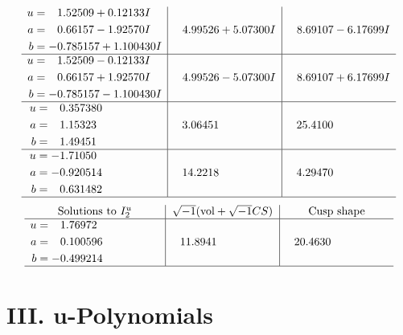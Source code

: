 \documentclass[1p]{elsarticle_modified}
\theoremstyle{definition}
\newcommand{\I}{\sqrt{-1}}
\begin{document}
$$\begin{array}{c|c|c}
\begin{aligned}
u &= \phantom{-}1.52509 + 0.12133 I \\
a &= \phantom{-}0.66157 - 1.92570 I \\
b &= -0.785157 + 1.100430 I\end{aligned}
 & \phantom{-}4.99526 + 5.07300 I & \phantom{-}8.69107 - 6.17699 I \\ \hline\begin{aligned}
u &= \phantom{-}1.52509 - 0.12133 I \\
a &= \phantom{-}0.66157 + 1.92570 I \\
b &= -0.785157 - 1.100430 I\end{aligned}
 & \phantom{-}4.99526 - 5.07300 I & \phantom{-}8.69107 + 6.17699 I \\ \hline\begin{aligned}
u &= \phantom{-}0.357380\phantom{ +0.000000I} \\
a &= \phantom{-}1.15323\phantom{ +0.000000I} \\
b &= \phantom{-}1.49451\phantom{ +0.000000I}\end{aligned}
 & \phantom{-}3.06451\phantom{ +0.000000I} & \phantom{-}25.4100\phantom{ +0.000000I} \\ \hline\begin{aligned}
u &= -1.71050\phantom{ +0.000000I} \\
a &= -0.920514\phantom{ +0.000000I} \\
b &= \phantom{-}0.631482\phantom{ +0.000000I}\end{aligned}
 & \phantom{-}14.2218\phantom{ +0.000000I} & \phantom{-}4.29470\phantom{ +0.000000I}\\
 \hline 
 \end{array}$$\newpage$$\begin{array}{c|c|c}  
\text{Solutions to }I^u_{2}& \I (\text{vol} + \sqrt{-1}CS) & \text{Cusp shape}\\
 \hline 
\begin{aligned}
u &= \phantom{-}1.76972\phantom{ +0.000000I} \\
a &= \phantom{-}0.100596\phantom{ +0.000000I} \\
b &= -0.499214\phantom{ +0.000000I}\end{aligned}
 & \phantom{-}11.8941\phantom{ +0.000000I} & \phantom{-}20.4630\phantom{ +0.000000I}\\
 \hline 
 \end{array}$$\newpage
\newpage\renewcommand{\arraystretch}{1}
\centering \section*{ III. u-Polynomials}
\end{document}
